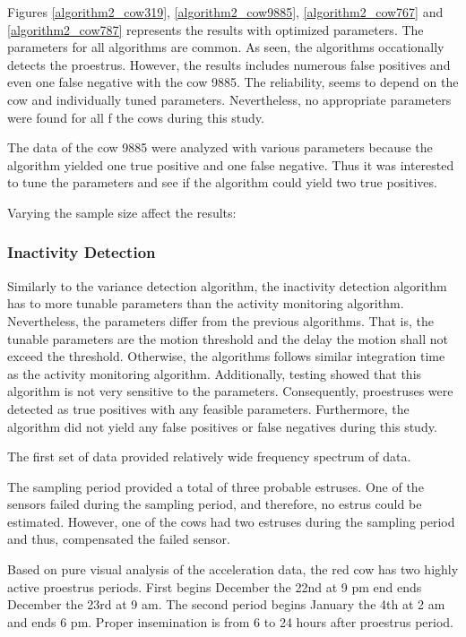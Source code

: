 \documentclass[english,12pt,a4paper,pdftex,elec,utf8]{aaltothesis}
\begin{document}
Figures \ref{algorithm2_cow319}, \ref{algorithm2_cow9885}, \ref{algorithm2_cow767} and \ref{algorithm2_cow787} represents the results with optimized parameters. The parameters for all algorithms are common. As seen, the algorithms occationally detects the proestrus. However, the results includes numerous false positives and even one false negative with the cow 9885. The reliability, seems to depend on the cow and individually tuned parameters. Nevertheless, no appropriate parameters were found for all f the cows during this study.

The data of the cow 9885 were analyzed with various parameters because the algorithm yielded one true positive and one false negative. Thus it was interested to tune the parameters and see if the algorithm could yield two true positives.


Varying the sample size affect the results:







\subsubsection{Inactivity Detection}\label{inactivitydetectionevaluation}

Similarly to the variance detection algorithm, the inactivity detection algorithm has to more tunable parameters than the activity monitoring algorithm. Nevertheless, the parameters differ from the previous algorithms. That is, the tunable parameters are the motion threshold and the delay the motion shall not exceed the threshold. Otherwise, the algorithms follows similar integration time as the activity monitoring algorithm. Additionally, testing showed that this algorithm is not very sensitive to the parameters. Consequently, proestruses were detected as true positives with any feasible parameters. Furthermore, the algorithm did not yield any false positives or false negatives during this study.




The first set of data provided relatively wide frequency spectrum of data.


The sampling period provided a total of three probable estruses. One of the sensors failed during the sampling period, and therefore, no estrus could be estimated. However, one of the cows had two estruses during the sampling period and thus, compensated the failed sensor.

Based on pure visual analysis of the acceleration data, the red cow has two highly active proestrus periods. First begins December the 22nd at 9 pm end ends December the 23rd at 9 am. The second period begins January the 4th at 2 am and ends 6 pm. Proper insemination is from 6 to 24 hours after proestrus period.
\end{document}
